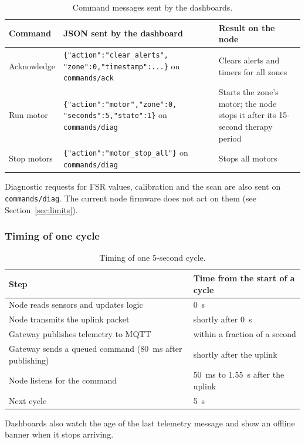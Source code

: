 {\small{}
\begin{table}[H]
\centering
\begin{tabularx}{\textwidth}{@{}>{\raggedright\arraybackslash}p{2.2cm}>{\raggedright\arraybackslash}p{6.2cm}X@{}}
\toprule
\textbf{Command} & \textbf{JSON sent by the dashboard} & \textbf{Result on the node}\\
\midrule
Acknowledge & \texttt{\{"action":"clear\_alerts", "zone":0,"timestamp":...\}} on \texttt{commands/ack} & Clears alerts and timers for all zones\\
Run motor & \texttt{\{"action":"motor","zone":0, "seconds":5,"state":1\}} on \texttt{commands/diag} & Starts the zone's motor; the node stops it after its 15-second therapy period\\
Stop motors & \texttt{\{"action":"motor\_stop\_all"\}} on \texttt{commands/diag} & Stops all motors\\
\bottomrule
\end{tabularx}
\caption{Command messages sent by the dashboards.}
\end{table}}
Diagnostic requests for FSR values, calibration and the \itwoc{} scan are also sent on \texttt{commands/diag}. The current node firmware does not act on them (see Section~\ref{sec:limits}).

\subsubsection{Timing of one cycle}
{\small{}
\begin{table}[H]
\centering
\begin{tabularx}{\textwidth}{@{}Xl@{}}
\toprule
\textbf{Step} & \textbf{Time from the start of a cycle}\\
\midrule
Node reads sensors and updates logic & 0~s\\
Node transmits the uplink packet & shortly after 0~s\\
Gateway publishes telemetry to MQTT & within a fraction of a second\\
Gateway sends a queued command (80~ms after publishing) & shortly after the uplink\\
Node listens for the command & 50~ms to 1.55~s after the uplink\\
Next cycle & 5~s\\
\bottomrule
\end{tabularx}
\caption{Timing of one 5-second cycle.}
\end{table}}
Dashboards also watch the age of the last telemetry message and show an offline banner when it stops arriving.

